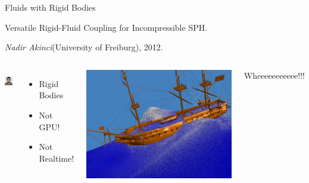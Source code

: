 \documentclass[12pt]{beamer}
\begin{document}
\begin{frame}[t]{Fluids with Rigid Bodies}

\pause

Versatile Rigid-Fluid Coupling for Incompressible SPH.

\textit{Nadir Akinci}(University of Freiburg), 2012.

\vspace{12pt}
\pause

\begin{columns}
\begin{center} \includegraphics[height=1cm]{Akinci} \end{center}
\pause

\begin{itemize}
\item \color{green} Rigid Bodies \pause
\item \alert{Not GPU!} \pause
\item \alert{Not Realtime!} \pause
\end{itemize}


\includegraphics[scale=0.4]{Akinci-Boat}

\pause
\tiny{Wheeeeeeeeeee!!!}

\end{columns}

\end{frame}

\end{document}
